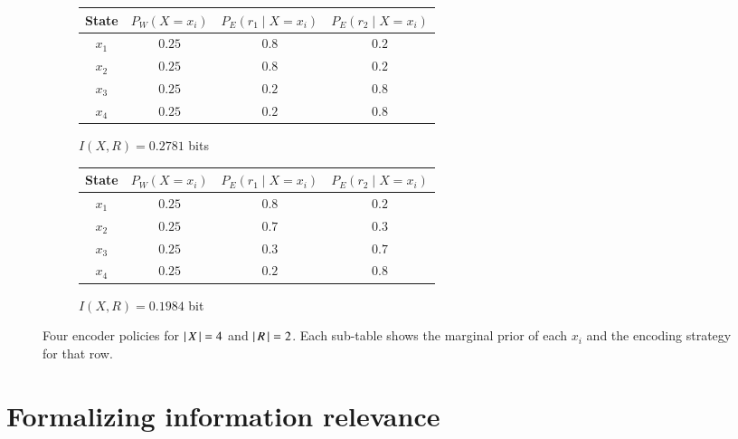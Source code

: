 \documentclass[nobib,nofonts]{tufte-handout}
\begin{document}
\begin{figure}[tp]
\begin{subfigure}[t]{0.48\linewidth}
\centering
\begin{tabular}{cccc}
\toprule
State & $P_{W}(X=x_{i})$ & $P_{E}(r_1\mid X=x_{i})$ & $P_{E}(r_2\mid X=x_{i})$ \\
\midrule
$x_1$ & $0.25$ & $0.8$ & $0.2$ \\
$x_2$ & $0.25$ & $0.8$ & $0.2$ \\
$x_3$ & $0.25$ & $0.2$ & $0.8$ \\
$x_4$ & $0.25$ & $0.2$ & $0.8$ \\
\bottomrule
\end{tabular}
\caption{$I(X,R) = 0.2781$ bits}
\end{subfigure}
\hfill
\begin{subfigure}[t]{0.48\linewidth}
\centering
\begin{tabular}{cccc}
\toprule
State & $P_{W}(X=x_{i})$ & $P_{E}(r_1\mid X=x_{i})$ & $P_{E}(r_2\mid X=x_{i})$ \\
\midrule
$x_1$ & $0.25$ & $0.8$ & $0.2$ \\
$x_2$ & $0.25$ & $0.7$ & $0.3$ \\
$x_3$ & $0.25$ & $0.3$ & $0.7$ \\
$x_4$ & $0.25$ & $0.2$ & $0.8$ \\
\bottomrule
\end{tabular}
\caption{$I(X,R) = 0.1984$ bit}
\end{subfigure}

\bigskip
\bigskip

\caption{
  Four encoder policies for $\left \lvert \, X \, \right\rvert=4$ and $\left \lvert \, R \, \right\rvert=2$.
  Each sub-table shows the marginal prior of each $x_{i}$ and the encoding strategy for that row.
}
\label{fig:mi-examples}
\end{figure}


\section{Formalizing information relevance}
\end{document}

